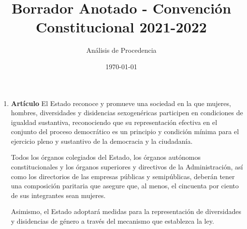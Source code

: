 \documentclass[11pt, a4paper]{article}
\title{Borrador Anotado - Convención Constitucional 2021-2022}
\author{Análisis de Procedencia}
\date{\today}
\begin{document}
\maketitle
\begin{enumerate}

\item \textbf{Artículo} \newline
El Estado reconoce y promueve una sociedad en la que mujeres, hombres, diversidades y disidencias sexogenéricas participen en condiciones de igualdad sustantiva, reconociendo que su representación efectiva en el conjunto del proceso democrático es un principio y condición mínima para el ejercicio pleno y sustantivo de la democracia y la ciudadanía. 

Todos los órganos colegiados del Estado, los órganos autónomos constitucionales y los órganos superiores y directivos de la Administración, así como los directorios de las empresas públicas y semipúblicas, deberán tener una composición paritaria que asegure que, al menos, el cincuenta por ciento de sus integrantes sean mujeres. 

Asimismo, el Estado adoptará medidas para la representación de diversidades y disidencias de género a través del mecanismo que establezca la ley. 


\end{enumerate}
\end{document}

